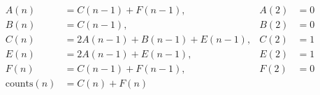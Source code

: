 \documentclass{article}
\begin{document}
\scriptsize
\begin{align*}
A(n) &= C(n-1) + F(n-1), &A(2) &= 0 \\
B(n) &= C(n-1), &B(2) &= 0 \\
C(n) &= 2A(n-1) + B(n-1) + E(n-1), &C(2) &= 1 \\
E(n) &= 2A(n-1) + E(n-1), &E(2) &= 1 \\
F(n) &= C(n-1) + F(n-1), &F(2) &= 0 \\
\text{counts}(n) &= C(n) + F(n) 
\end{align*}
\end{document}

